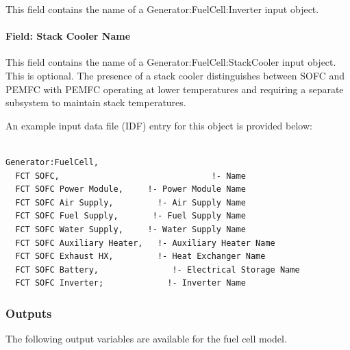 This field contains the name of a Generator:FuelCell:Inverter input object.

\paragraph{Field: Stack Cooler Name}\label{field-stack-cooler-name}

This field contains the name of a Generator:FuelCell:StackCooler input object. This is optional. The presence of a stack cooler distinguishes between SOFC and PEMFC with PEMFC operating at lower temperatures and requiring a separate subsystem to maintain stack temperatures.

An example input data file (IDF) entry for this object is provided below:

\begin{lstlisting}

Generator:FuelCell,
  FCT SOFC,                               !- Name
  FCT SOFC Power Module,     !- Power Module Name
  FCT SOFC Air Supply,         !- Air Supply Name
  FCT SOFC Fuel Supply,       !- Fuel Supply Name
  FCT SOFC Water Supply,     !- Water Supply Name
  FCT SOFC Auxiliary Heater,   !- Auxiliary Heater Name
  FCT SOFC Exhaust HX,         !- Heat Exchanger Name
  FCT SOFC Battery,               !- Electrical Storage Name
  FCT SOFC Inverter;             !- Inverter Name
\end{lstlisting}

\subsubsection{Outputs}\label{outputs-9-001}

The following output variables are available for the fuel cell model.


